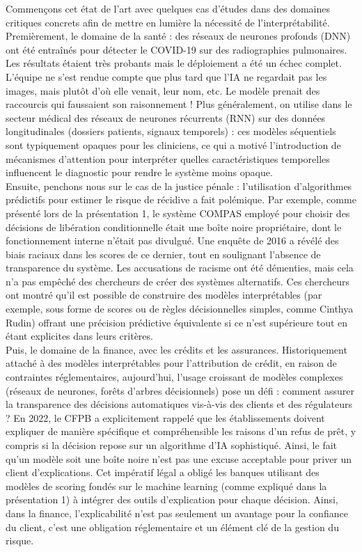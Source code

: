 \documentclass{article}
\begin{document}
\quad Commençons cet état de l’art avec quelques cas d'études dans des domaines critiques concrets afin de mettre en lumière la nécessité de l'interprétabilité.\\

Premièrement, le domaine de la santé : des réseaux de neurones profonds (DNN) ont été entraînés pour détecter le COVID-19 sur des radiographies pulmonaires. Les résultats étaient très probants mais le déploiement a été un échec complet. L'équipe ne s'est rendue compte que plus tard que l’IA ne regardait pas les images, mais plutôt d'où elle venait, leur nom, etc. Le modèle prenait des raccourcis qui faussaient son raisonnement ! Plus généralement, on utilise dans le secteur médical des réseaux de neurones récurrents (RNN) sur des données longitudinales (dossiers patients, signaux temporels) : ces modèles séquentiels sont typiquement opaques pour les cliniciens, ce qui a motivé l’introduction de mécanismes d’attention pour interpréter quelles caractéristiques temporelles influencent le diagnostic pour rendre le système moins opaque.\\

Ensuite, penchons nous sur le cas de la justice pénale : l’utilisation d’algorithmes prédictifs pour estimer le risque de récidive a fait polémique. Par exemple, comme présenté lors de la présentation 1, le système COMPAS employé pour choisir des décisions de libération conditionnelle était une boîte noire propriétaire, dont le fonctionnement interne n’était pas divulgué. Une enquête de 2016 a révélé des biais raciaux dans les scores de ce dernier, tout en soulignant l’absence de transparence du système. Les accusations de racisme ont été démenties, mais cela n’a pas empêché des chercheurs de créer des systèmes alternatifs. Ces chercheurs ont montré qu’il est possible de construire des modèles interprétables (par exemple, sous forme de scores ou de règles décisionnelles simples, comme Cinthya Rudin) offrant une précision prédictive équivalente si ce n’est supérieure tout en étant explicites dans leurs critères.\\

Puis, le domaine de la finance, avec les crédits et les assurances. Historiquement attaché à des modèles interprétables pour l’attribution de crédit, en raison de contraintes réglementaires, aujourd’hui, l’usage croissant de modèles complexes (réseaux de neurones, forêts d’arbres décisionnels) pose un défi : comment assurer la transparence des décisions automatiques vis-à-vis des clients et des régulateurs ? En 2022, le CFPB a explicitement rappelé que les établissements doivent expliquer de manière spécifique et compréhensible les raisons d’un refus de prêt, y compris si la décision repose sur un algorithme d’IA sophistiqué. Ainsi, le fait qu’un modèle soit une boîte noire n’est pas une excuse acceptable pour priver un client d’explications. Cet impératif légal a obligé les banques utilisant des modèles de scoring fondés sur le machine learning (comme expliqué dans la présentation 1) à intégrer des outils d’explication pour chaque décision. Ainsi, dans la finance, l’explicabilité n’est pas seulement un avantage pour la confiance du client, c’est une obligation réglementaire et un élément clé de la gestion du risque.\\
\end{document}
